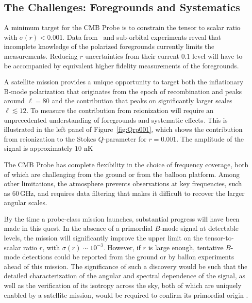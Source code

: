 \subsection{The Challenges: Foregrounds and Systematics}
\label{sec:foregrounds}
\vspace{-0.05in}

A minimum target for the CMB Probe is to constrain the tensor to scalar ratio with $\sigma(r) < 0.001$. Data from \planck\ and 
sub-orbital experiments reveal that incomplete knowledge of the polarized foregrounds currently limits the measurements. 
Reducing $r$ uncertainties from their current $0.1$ level will have to be accompanied by equivalent higher fidelity measurements of the foregrounds. 



A satellite mission provides a unique opportunity to target both the inflationary B-mode polarization that originates from the epoch of recombination and peaks around $\ell=80$ and the contribution that peaks on significantly larger scales $\ell\lesssim 12$. To measure the contribution from reionization will require an unprecedented understanding of foregrounds and systematic effects. This is illustrated in the left panel of Figure~\ref{fig:Qrp001}, which shows the contribution from reionization to the Stokes $Q$-parameter for $r=0.001$. The amplitude of the signal is approximately $10$ nK


The CMB Probe has complete flexibility in the choice of frequency coverage, both of which are challenging from the ground or from the balloon platform.  Among other limitations, the atmosphere prevents observations at key frequencies, such as 60\,GHz, and requires data filtering that makes it difficult to recover the larger angular scales.

By the time a probe-class mission launches, substantial progress will
have been made in this quest.  In the absence of a primordial $B$-mode
signal at detectable levels, the mission will significantly improve
the upper limit on the tensor-to-scalar ratio $r$, with
$\sigma(r)\!\sim\!10^{-3}$.  However, if $r$ is large enough,
tentative $B$-mode detections could be reported from the ground or by
ballon experiments ahead of this mission. The significance of such a
discovery would be such that the detailed characterization of the
angular and spectral dependence of the signal, as well as the
verification of its isotropy across the sky, both of which are
uniquely enabled by a satellite mission, would be required to confirm
its primordial origin .

